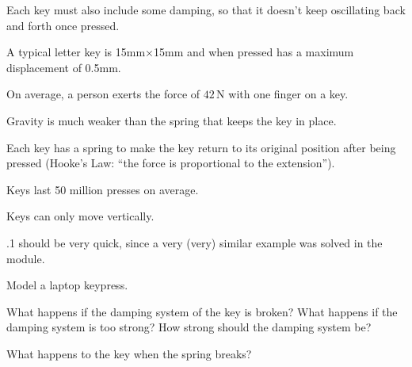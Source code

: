 \begin{itemize}
\begin{minipage}{.4\textwidth}
\item[\color{Gray}(da)] Each key must also include some damping, so that it doesn't keep oscillating back and forth once pressed.

\item[\color{Gray}(di)] A typical letter key is 15mm$\times$15mm and when pressed has a maximum displacement of 0.5mm.

\item[\color{Gray}(fo)] On average, a person exerts the force of $42\,$N with one finger on a key.
\end{minipage}
\hfill
\begin{minipage}{.4\textwidth}
\item[\color{Gray}(gr)] Gravity is much weaker than the spring that keeps the key in place.

\item[\color{Gray}(hl)] Each key has a spring to make the key return to its original position after being pressed (Hooke's Law: ``the force is proportional to the extension'').

\item[\color{Gray}(lo)] Keys last 50 million presses on average.

\item[\color{Gray}(ve)] Keys can only move vertically.
\end{minipage}
\end{itemize}
	
\begin{annotation}
	\begin{goals}
		.1 should be very quick, since a very (very) similar example was solved in the module.
	\end{goals}
\end{annotation}
\begin{parts}
	\item Model a laptop keypress.
	\item What happens if the damping system of the key is broken? What happens if the damping system is too strong? How strong should the damping system be?
	\item What happens to the key when the spring breaks?
\end{parts}





\bookonlynewpage

